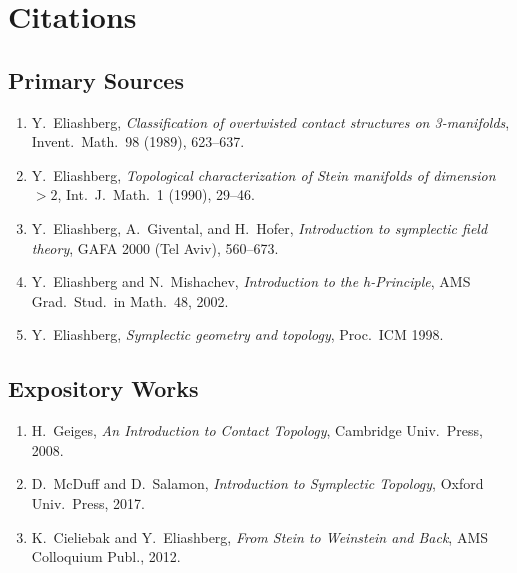 \section{Citations}\subsection*{Primary Sources}
\begin{enumerate}
    \item Y.\ Eliashberg, \textit{Classification of overtwisted contact structures on 3-manifolds}, Invent.\ Math.\ 98 (1989), 623--637.
    \item Y.\ Eliashberg, \textit{Topological characterization of Stein manifolds of dimension $> 2$}, Int.\ J.\ Math.\ 1 (1990), 29--46.
    \item Y.\ Eliashberg, A.\ Givental, and H.\ Hofer, \textit{Introduction to symplectic field theory}, GAFA 2000 (Tel Aviv), 560--673.
    \item Y.\ Eliashberg and N.\ Mishachev, \textit{Introduction to the h-Principle}, AMS Grad.\ Stud.\ in Math.\ 48, 2002.
    \item Y.\ Eliashberg, \textit{Symplectic geometry and topology}, Proc.\ ICM 1998.
\end{enumerate}

\subsection*{Expository Works}
\begin{enumerate}
    \item H.\ Geiges, \textit{An Introduction to Contact Topology}, Cambridge Univ.\ Press, 2008.
    \item D.\ McDuff and D.\ Salamon, \textit{Introduction to Symplectic Topology}, Oxford Univ.\ Press, 2017.
    \item K.\ Cieliebak and Y.\ Eliashberg, \textit{From Stein to Weinstein and Back}, AMS Colloquium Publ., 2012.
\end{enumerate}

